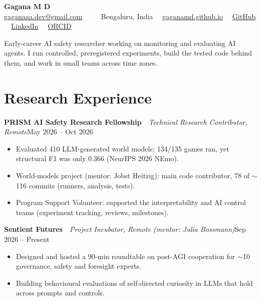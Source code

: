 \documentclass[10pt,a4paper]{article}
\newcommand{\job}[3]{\textbf{#1}\ \textendash\ \textit{#2}\hfill #3\par}
\newcommand{\link}[2]{\href{#1}{\color{accent}#2}}
\begin{document}
\begin{center}
{\LARGE\bfseries Gagana M D}\\[3pt]
\small
\link{mailto:gaganaaa.dev@gmail.com}{gaganaaa.dev@gmail.com}
\ifdefined\cvphone\ \textbullet\ \cvphone\fi
\ \textbullet\ Bengaluru, India
\ \textbullet\ \link{https://gaganamd.github.io}{gaganamd.github.io}
\ \textbullet\ \link{https://github.com/GaganaMD}{GitHub}
\ \textbullet\ \link{https://www.linkedin.com/in/gaganamd/}{LinkedIn}
\ \textbullet\ \link{https://orcid.org/0009-0003-2594-1026}{ORCID}
\end{center}
\vspace{-2pt}

Early-career AI safety researcher working on monitoring and evaluating AI agents. I run controlled, preregistered experiments,
build the tested code behind them, and work in small teams across time zones.

\section{Research Experience}

\job{PRISM AI Safety Research Fellowship}{Technical Research Contributor, Remote}{May 2026 -- Oct 2026}
\begin{itemize}
  \item Evaluated 410 LLM-generated world models: 134/135 games ran, yet structural F1 was only 0.366 (NeurIPS 2026 NEmo).
  \item World-models project (mentor: Jobst Heitzig): main code contributor, 78 of $\sim$116 commits (runners, analysis, tests).
  \item Program Support Volunteer: supported the interpretability and AI control teams (experiment tracking, reviews, milestones).
\end{itemize}

\job{Sentient Futures}{Project Incubator, Remote (mentor: Julia Bossmann)}{Sep 2026 -- Present}
\begin{itemize}
  \item Designed and hosted a 90-min roundtable on post-AGI cooperation for $\sim$10 governance, safety and foresight experts.
  \item Building behavioural evaluations of self-directed curiosity in LLMs that hold across prompts and controls.
\end{itemize}
\end{document}
